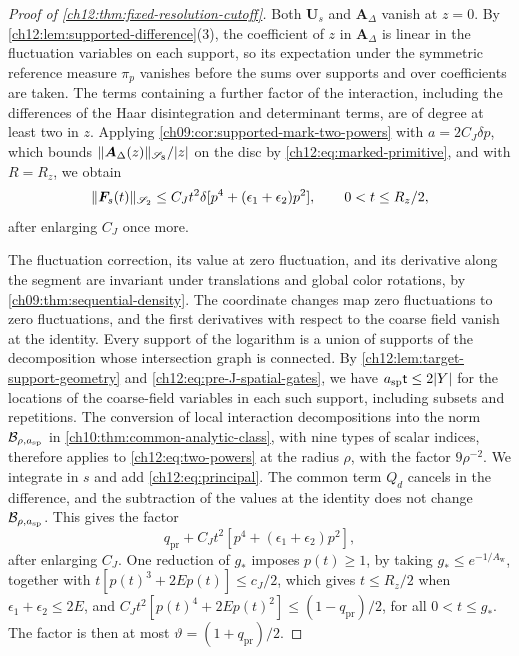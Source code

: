 \begin{proof}[Proof of \cref{ch12:thm:fixed-resolution-cutoff}]
Both $\boldsymbol U_s$ and $\boldsymbol A_\Delta$ vanish at $z=0$. By \cref{ch12:lem:supported-difference}(3), the coefficient of $z$ in $\boldsymbol A_\Delta$ is linear in the fluctuation variables on each support, so its expectation under the symmetric reference measure $\pi_p$ vanishes before the sums over supports and over coefficients are taken. The terms containing a further factor of the interaction, including the differences of the Haar disintegration and determinant terms, are of degree at least two in $z$. Applying \cref{ch09:cor:supported-mark-two-powers} with $a=2C_J\delta p$, which bounds $\lVert \boldsymbol A_\Delta(z)\rVert_{\mathscr S_8}/\lvert z\rvert$ on the disc by \eqref{ch12:eq:marked-primitive}, and with $R=R_z$, we obtain
\begin{equation}\label{ch12:eq:two-powers}
 \lVert \boldsymbol F_s(t)\rVert_{\mathscr S_2}\le C_Jt^2\delta[p^4+(\epsilon_1+\epsilon_2)p^2],\qquad 0<t\le R_z/2,
\end{equation}
after enlarging $C_J$ once more.

The fluctuation correction, its value at zero fluctuation, and its derivative along the segment are invariant under translations and global color rotations, by \cref{ch09:thm:sequential-density}. The coordinate changes map zero fluctuations to zero fluctuations, and the first derivatives with respect to the coarse field vanish at the identity. Every support of the logarithm is a union of supports of the decomposition whose intersection graph is connected. By \cref{ch12:lem:target-support-geometry} and \eqref{ch12:eq:pre-J-spatial-gates}, we have $a_{\mathrm{sp}}\mathsf t\le2\lvert Y\rvert$ for the locations of the coarse-field variables in each such support, including subsets and repetitions. The conversion of local interaction decompositions into the norm $\mathcal B_{\rho,a_{\mathrm{sp}}}$ in \cref{ch10:thm:common-analytic-class}, with nine types of scalar indices, therefore applies to \eqref{ch12:eq:two-powers} at the radius $\rho$, with the factor $9\rho^{-2}$. We integrate in $s$ and add \eqref{ch12:eq:principal}. The common term $Q_d$ cancels in the difference, and the subtraction of the values at the identity does not change $\mathcal B_{\rho,a_{\mathrm{sp}}}$. This gives the factor
\[
 q_{\mathrm{pr}}+C_Jt^2[p^4+(\epsilon_1+\epsilon_2)p^2],
\]
after enlarging $C_J$. One reduction of $g_*$ imposes $p(t)\ge1$, by taking $g_*\le e^{-1/A_{\mathrm w}}$, together with $t[p(t)^3+2Ep(t)]\le c_J/2$, which gives $t\le R_z/2$ when $\epsilon_1+\epsilon_2\le2E$, and $C_Jt^2[p(t)^4+2Ep(t)^2]\le(1-q_{\mathrm{pr}})/2$, for all $0<t\le g_*$. The factor is then at most $\vartheta=(1+q_{\mathrm{pr}})/2$.


\end{proof}
